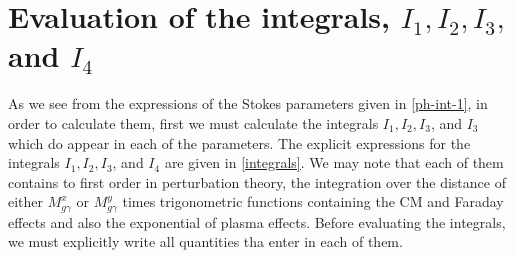 \documentclass[a4paper,11pt]{article}
\begin{document}
\section{Evaluation of the integrals, $I_1, I_2, I_3,$ and $I_4$}
\label{sec:6}


As we see from the expressions of the Stokes parameters given in \eqref{ph-int-1}, in order to calculate them, first we must calculate the integrals $I_1, I_2, I_3$, and $I_3$ which do appear in each of the parameters. The explicit expressions for the integrals $I_1, I_2, I_3$, and $I_4$ are given in \eqref{integrals}. We may note that each of them contains to first order in perturbation theory, the integration over the distance of either $M_{g\gamma}^{x}$ or $M_{g\gamma}^y$ times trigonometric functions containing the CM and Faraday effects and also the exponential of plasma effects. Before evaluating the integrals, we must explicitly write all quantities tha enter in each of them. 
\end{document}
